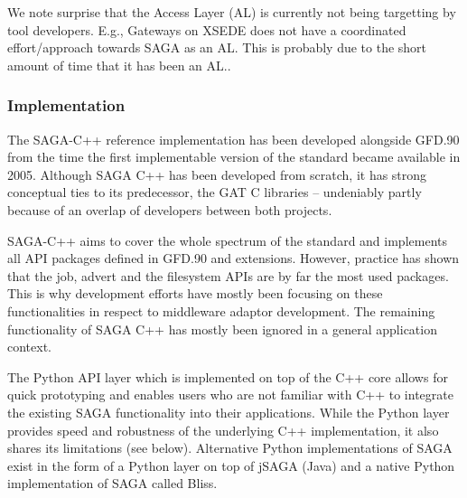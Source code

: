 \documentclass[]{article}
\begin{document}
  We note surprise that the Access Layer (AL) is currently not being
  targetting by tool developers. E.g., Gateways on XSEDE does not have
  a coordinated effort/approach towards SAGA as an AL. This is
  probably due to the short amount of time that it has been an AL..

  \subsubsection{Implementation}

   The SAGA-C++ reference implementation has been developed alongside
   GFD.90 from the time the first implementable version of the standard
   became available in 2005. Although SAGA C++ has been developed from
   scratch, it has strong conceptual ties to its predecessor, the GAT
   C libraries -- undeniably partly because of an overlap of developers
   between both projects.

   SAGA-C++ aims to cover the whole spectrum of the standard and
   implements all API packages defined in GFD.90 and extensions.
   However, practice has shown that the job, advert and the filesystem
   APIs are by far the most used packages.  
   This is why development efforts have mostly been focusing
   on these functionalities in respect to middleware adaptor
   development. The remaining functionality of SAGA C++ has mostly 
   been ignored in a general application context.
     
   The Python API layer which is implemented on top of the C++ core
   allows for quick prototyping and enables users who are not familiar
   with C++ to integrate the existing SAGA functionality into their
   applications. While the Python layer provides speed and robustness 
   of the underlying C++ implementation, it also shares its limitations
   (see below). Alternative Python implementations of SAGA exist in 
   the form of a Python layer on top of jSAGA (Java) and a native Python
   implementation of SAGA called Bliss\cite{bliss_web}.

   
  
\end{document}
